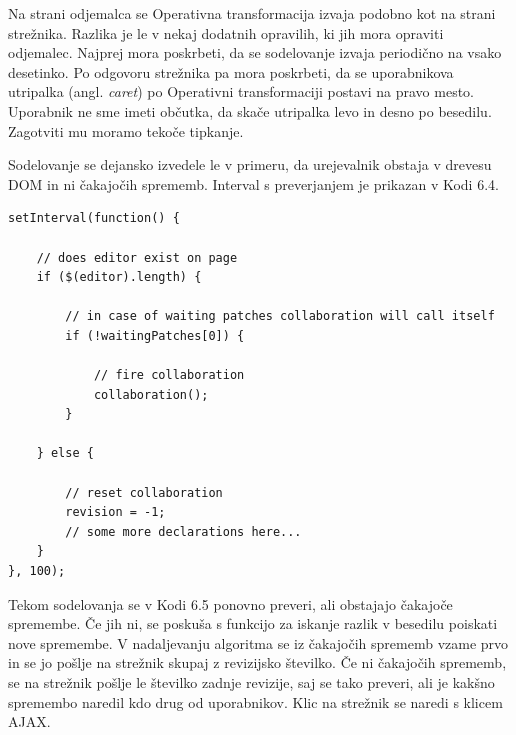 \documentclass[a4paper, 12pt, twoside]{book}
\begin{document}
Na strani odjemalca se Operativna transformacija izvaja podobno kot na strani strežnika. Razlika je le v nekaj dodatnih opravilih, ki jih mora opraviti odjemalec. Najprej mora poskrbeti, da se sodelovanje izvaja periodično na vsako desetinko. Po odgovoru strežnika pa mora poskrbeti, da se uporabnikova utripalka (angl. \textit{caret}) po Operativni transformaciji postavi na pravo mesto. Uporabnik ne sme imeti občutka, da skače utripalka levo in desno po besedilu. Zagotviti mu moramo tekoče tipkanje.

Sodelovanje se dejansko izvedele le v primeru, da urejevalnik obstaja v drevesu DOM in ni čakajočih sprememb. Interval s preverjanjem je prikazan v Kodi 6.4.\newline

\begin{lstlisting}[title={Koda 6.4: Periodično izvajanja sodelovanja.}]
setInterval(function() {

    // does editor exist on page
    if ($(editor).length) {

        // in case of waiting patches collaboration will call itself
        if (!waitingPatches[0]) {

            // fire collaboration
            collaboration();
        }
        
    } else {

        // reset collaboration
        revision = -1;
        // some more declarations here...
    }
}, 100);
\end{lstlisting}

Tekom sodelovanja se v Kodi 6.5 ponovno preveri, ali obstajajo čakajoče spremembe. Če jih ni, se poskuša s funkcijo za iskanje razlik v besedilu poiskati nove spremembe. V nadaljevanju algoritma se iz čakajočih sprememb vzame prvo in se jo pošlje na strežnik skupaj z revizijsko številko. Če ni čakajočih sprememb, se na strežnik pošlje le številko zadnje revizije, saj se tako preveri, ali je kakšno spremembo naredil kdo drug od uporabnikov. Klic na strežnik se naredi s klicem AJAX.\newline
\end{document}
